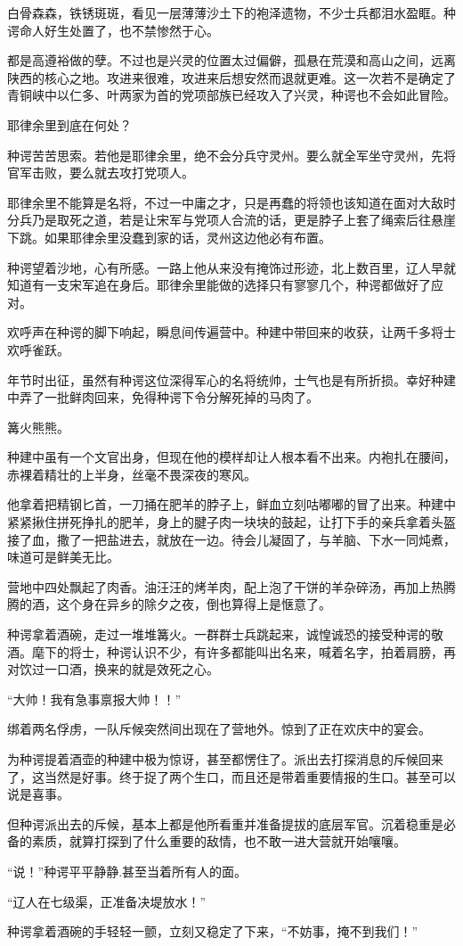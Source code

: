 白骨森森，铁锈斑斑，看见一层薄薄沙土下的袍泽遗物，不少士兵都泪水盈眶。种谔命人好生处置了，也不禁惨然于心。

都是高遵裕做的孽。不过也是兴灵的位置太过偏僻，孤悬在荒漠和高山之间，远离陕西的核心之地。攻进来很难，攻进来后想安然而退就更难。这一次若不是确定了青铜峡中以仁多、叶两家为首的党项部族已经攻入了兴灵，种谔也不会如此冒险。

耶律余里到底在何处？

种谔苦苦思索。若他是耶律余里，绝不会分兵守灵州。要么就全军坐守灵州，先将官军击败，要么就去攻打党项人。

耶律余里不能算是名将，不过一中庸之才，只是再蠢的将领也该知道在面对大敌时分兵乃是取死之道，若是让宋军与党项人合流的话，更是脖子上套了绳索后往悬崖下跳。如果耶律余里没蠢到家的话，灵州这边他必有布置。

种谔望着沙地，心有所感。一路上他从来没有掩饰过形迹，北上数百里，辽人早就知道有一支宋军追在身后。耶律余里能做的选择只有寥寥几个，种谔都做好了应对。

欢呼声在种谔的脚下响起，瞬息间传遍营中。种建中带回来的收获，让两千多将士欢呼雀跃。

年节时出征，虽然有种谔这位深得军心的名将统帅，士气也是有所折损。幸好种建中弄了一批鲜肉回来，免得种谔下令分解死掉的马肉了。

篝火熊熊。

种建中虽有一个文官出身，但现在他的模样却让人根本看不出来。内袍扎在腰间，赤裸着精壮的上半身，丝毫不畏深夜的寒风。

他拿着把精钢匕首，一刀捅在肥羊的脖子上，鲜血立刻咕嘟嘟的冒了出来。种建中紧紧揪住拼死挣扎的肥羊，身上的腱子肉一块块的鼓起，让打下手的亲兵拿着头盔接了血，撒了一把盐进去，就放在一边。待会儿凝固了，与羊脑、下水一同炖煮，味道可是鲜美无比。

营地中四处飘起了肉香。油汪汪的烤羊肉，配上泡了干饼的羊杂碎汤，再加上热腾腾的酒，这个身在异乡的除夕之夜，倒也算得上是惬意了。

种谔拿着酒碗，走过一堆堆篝火。一群群士兵跳起来，诚惶诚恐的接受种谔的敬酒。麾下的将士，种谔认识不少，有许多都能叫出名来，喊着名字，拍着肩膀，再对饮过一口酒，换来的就是效死之心。

“大帅！我有急事禀报大帅！！”

绑着两名俘虏，一队斥候突然间出现在了营地外。惊到了正在欢庆中的宴会。

为种谔提着酒壶的种建中极为惊讶，甚至都愣住了。派出去打探消息的斥候回来了，这当然是好事。终于捉了两个生口，而且还是带着重要情报的生口。甚至可以说是喜事。

但种谔派出去的斥候，基本上都是他所看重并准备提拔的底层军官。沉着稳重是必备的素质，就算打探到了什么重要的敌情，也不敢一进大营就开始嚷嚷。

“说！”种谔平平静静.甚至当着所有人的面。

“辽人在七级渠，正准备决堤放水！”

种谔拿着酒碗的手轻轻一颤，立刻又稳定了下来，“不妨事，掩不到我们！”

